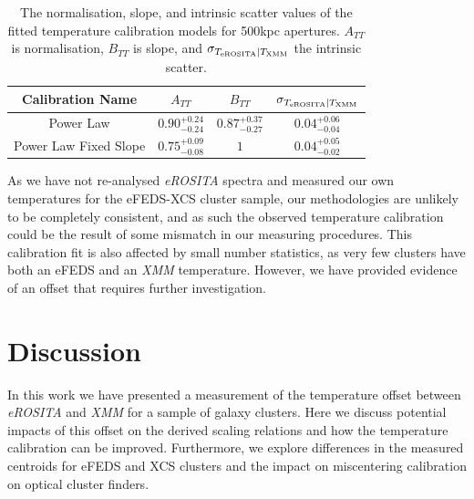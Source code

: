 \documentclass[fleqn,usenatbib]{mnras}
\begin{document}
\begin{table}
\begin{center}
\caption[]{{\small The normalisation, slope, and intrinsic scatter values of the fitted temperature calibration models for 500kpc apertures. $A_{TT}$ is normalisation, $B_{TT}$ is slope, and $\sigma_{T_{\rm{eROSITA}}|T_{\rm{XMM}}}$ the intrinsic scatter.}\label{tab:tempcal}}
\vspace{1mm}
\begin{tabular}{cccc}
\hline
\hline
Calibration Name & $A_{TT}$ & $B_{TT}$ & $\sigma_{T_{\rm{eROSITA}}|T_{\rm{XMM}}}$\\
\hline
\hline
Power Law & $0.90^{+0.24}_{-0.24}$ & $0.87^{+0.37}_{-0.27}$ & $0.04^{+0.06}_{-0.04}$ \\
\hline
Power Law Fixed Slope & $0.75^{+0.09}_{-0.08}$ & $1$ & $0.04^{+0.05}_{-0.02}$ \\
\hline
\end{tabular}
\end{center}
\end{table}

As we have not re-analysed {\em eROSITA} spectra and measured our own temperatures for the eFEDS-XCS cluster sample, our methodologies are unlikely to be completely consistent, and as such the observed temperature calibration could be the result of some mismatch in our measuring procedures. This calibration fit is also affected by small number statistics, as very few clusters have both an eFEDS and an {\em XMM} temperature. However, we have provided evidence of an offset that requires further investigation.


\section{Discussion}
\label{sec:discussion}
In this work we have presented a measurement of the temperature offset between {\em eROSITA} and {\em XMM} for a sample of galaxy clusters.  Here we discuss potential impacts of this offset on the derived scaling relations and how the temperature calibration can be improved.  Furthermore, we explore differences in the measured centroids for eFEDS and XCS clusters and the impact on miscentering calibration on optical cluster finders.
\end{document}
